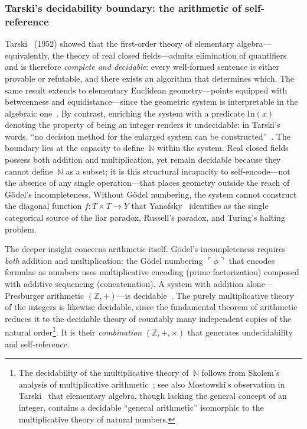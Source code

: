 \subsubsection{Tarski's decidability boundary: the arithmetic
of self-reference}\label{sssec:tarski}

Tarski~\cite{tarski52} (1952) showed that the first-order theory of
elementary algebra---equivalently, the theory of real closed
fields---admits elimination of quantifiers and is therefore
\emph{complete and decidable}: every well-formed sentence is either
provable or refutable, and there exists an algorithm that determines
which.  The same result extends to elementary Euclidean
geometry---points equipped with betweenness and equidistance---since
the geometric system is interpretable in the
algebraic one~\cite{tarskigivant99}.
By contrast, enriching the system with a predicate
$\mathrm{In}(x)$ denoting the property of being an integer renders it
undecidable: in Tarski's words, ``no decision method for the enlarged
system can be constructed''~\cite{tarski52}.  The boundary
lies at the capacity to define~$\mathbb{N}$ within the system.
Real closed fields possess both addition and multiplication, yet
remain decidable because they cannot define~$\mathbb{N}$ as a subset;
it is this structural incapacity to self-encode---not the absence of
any single operation---that places geometry outside the reach of
G\"odel's incompleteness.  Without G\"odel numbering, the system
cannot construct the diagonal function $f\colon T\times T\to Y$ that
Yanofsky~\cite{yanofsky03} identifies as the single categorical source
of the liar paradox, Russell's paradox, and Turing's halting problem.

The deeper insight concerns arithmetic itself.  G\"odel's
incompleteness requires \emph{both} addition and multiplication: the
G\"odel numbering $\ulcorner\phi\urcorner$ that encodes formulas as
numbers uses multiplicative encoding (prime factorization) composed
with additive sequencing (concatenation).  A system with addition
alone---Presburger arithmetic $(\mathbb{Z}, +)$---is
decidable~\cite{presburger29}.  The purely multiplicative theory of the
integers is likewise decidable, since the fundamental theorem of
arithmetic reduces it to the decidable theory of countably many
independent copies of the natural order\footnote{The decidability of
the multiplicative theory of~$\mathbb{N}$ follows from Skolem’s
analysis of multiplicative arithmetic~\cite{skolem31}; see also
Mostowski’s observation in Tarski~\cite[Note~5]{tarski52}
that elementary algebra, though lacking the general concept of an
integer, contains a decidable ``general arithmetic'' isomorphic to the multiplicative theory of natural numbers.}.  It is their
\emph{combination} $(\mathbb{Z}, +, \times)$ that generates
undecidability and self-reference.

